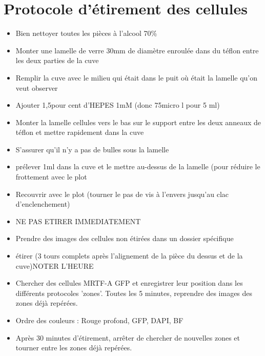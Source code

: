 \documentclass{report}
\begin{document}
\section{Protocole d'étirement des cellules}

\begin{itemize}
\item Bien nettoyer toutes les pièces à l'alcool 70\%
\item Monter une lamelle de verre 30mm de diamètre enroulée dans du téflon entre les deux parties de la cuve
\item Remplir la cuve avec le milieu qui était dans le puit où était la lamelle qu'on veut observer
\item Ajouter 1,5pour cent d'HEPES 1mM (donc 75micro l pour 5 ml)
\item Monter la lamelle cellules vers le bas sur le support entre les deux anneaux de téflon et mettre rapidement dans la cuve
\item S'assurer qu'il n'y a pas de bulles sous la lamelle
\item prélever 1ml dans la cuve et le mettre au-dessus de la lamelle (pour réduire le frottement avec le plot
\item Recouvrir avec le plot (tourner le pas de vis à l'envers jusqu'au clac d'enclenchement)
\item NE PAS ETIRER IMMEDIATEMENT
\item Prendre des images des cellules non étirées dans un dossier spécifique
\item étirer (3 tours complets après l'alignement de la pièce du dessus et de la cuve)NOTER L'HEURE
\item Chercher des cellules MRTF-A GFP et enregistrer leur position dans les différents protocoles 'zones'. Toutes les 5 minutes, reprendre des images des zones déjà repérées. 
\item Ordre des couleurs : Rouge profond, GFP, DAPI, BF
\item Après 30 minutes d'étirement, arrêter de chercher de nouvelles zones et tourner entre les zones déjà repérées. 
\end{itemize}
\end{document}
